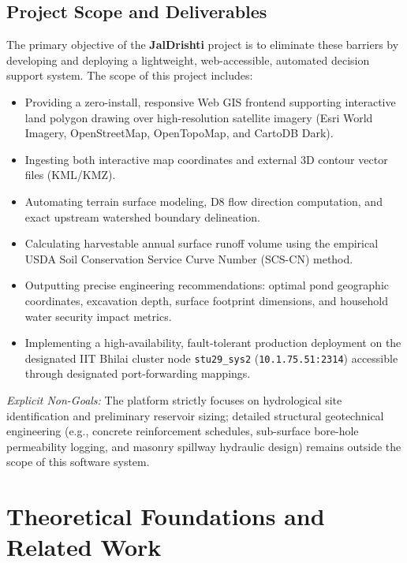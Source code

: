 \documentclass[11pt,a4paper]{article}
\begin{document}
\subsection{Project Scope and Deliverables}
The primary objective of the \textbf{JalDrishti} project is to eliminate these barriers by developing and deploying a lightweight, web-accessible, automated decision support system. The scope of this project includes:
\begin{itemize}[noitemsep,topsep=2pt]
    \item Providing a zero-install, responsive Web GIS frontend supporting interactive land polygon drawing over high-resolution satellite imagery (Esri World Imagery, OpenStreetMap, OpenTopoMap, and CartoDB Dark).
    \item Ingesting both interactive map coordinates and external 3D contour vector files (KML/KMZ).
    \item Automating terrain surface modeling, D8 flow direction computation, and exact upstream watershed boundary delineation.
    \item Calculating harvestable annual surface runoff volume using the empirical USDA Soil Conservation Service Curve Number (SCS-CN) method.
    \item Outputting precise engineering recommendations: optimal pond geographic coordinates, excavation depth, surface footprint dimensions, and household water security impact metrics.
    \item Implementing a high-availability, fault-tolerant production deployment on the designated IIT Bhilai cluster node \texttt{stu29\_sys2} (\texttt{10.1.75.51:2314}) accessible through designated port-forwarding mappings.
\end{itemize}

\textit{Explicit Non-Goals:} The platform strictly focuses on hydrological site identification and preliminary reservoir sizing; detailed structural geotechnical engineering (e.g., concrete reinforcement schedules, sub-surface bore-hole permeability logging, and masonry spillway hydraulic design) remains outside the scope of this software system.

\section{Theoretical Foundations and Related Work}
\label{sec:theory}
\end{document}
